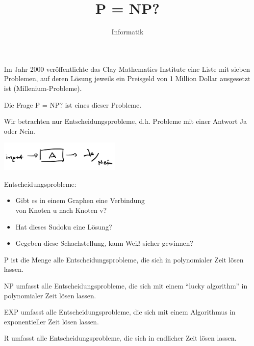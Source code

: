 \documentclass{beamer}
\begin{document}
\title{P = NP?}   
\author{Informatik} 
\date{ } 

\frame{\titlepage} 

\begin{frame}[fragile]
Im Jahr 2000 veröffentlichte das Clay Mathematics Institute eine Liste mit sieben Problemen, auf deren Lösung jeweils ein Preisgeld von 1 Million Dollar ausgesetzt ist (Millenium-Probleme). 

Die Frage P = NP? ist eines dieser Probleme.
\end{frame}


\begin{frame}[fragile]
Wir betrachten nur Entscheidungsprobleme, d.h. Probleme mit einer Antwort Ja oder Nein.

\includegraphics[width=6cm]{bild4.png}



Entscheidungsprobleme:

\begin{itemize}
\item Gibt es in einem Graphen eine Verbindung \\
von Knoten u nach Knoten v?
\item Hat dieses Sudoku eine Lösung?
\item Gegeben diese Schachstellung, kann Weiß sicher gewinnen?
\end{itemize}
\end{frame}

\begin{frame}[fragile]

P ist die Menge alle Entscheidungsprobleme, die sich  in polynomialer Zeit lösen lassen.   

NP umfasst alle Entscheidungsprobleme, die sich mit einem ``lucky algorithm'' in polynomialer Zeit lösen lassen.   

EXP umfasst alle Entscheidungsprobleme, die sich mit einem Algorithmus in exponentieller Zeit lösen lassen. 

R umfasst alle Entscheidungsprobleme, die sich in endlicher Zeit lösen lassen.  
\end{frame}
 
\end{document}
